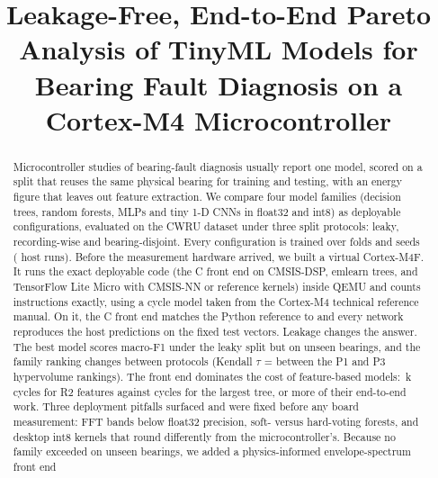 \documentclass[conference]{IEEEtran}
\begin{document}
\title{Leakage-Free, End-to-End Pareto Analysis of TinyML Models for Bearing Fault Diagnosis on a Cortex-M4 Microcontroller}

\author{
}

\maketitle

\begin{abstract}
Microcontroller studies of bearing-fault diagnosis usually report one model, scored on a split that reuses the same
physical bearing for training and testing, with an energy figure that leaves out feature extraction. We compare four
model families (decision trees, random forests, MLPs and tiny 1-D CNNs in float32 and int8) as \NumConfigs{}
deployable configurations, evaluated on the CWRU dataset under three split protocols: leaky, recording-wise and
bearing-disjoint. Every configuration is trained over \NumSplits{} folds and \NumSeedsMax{} seeds
(\NumRuns{} host runs). Before the measurement hardware arrived, we built a virtual Cortex-M4F. It runs the exact
deployable code (the C front end on CMSIS-DSP, emlearn trees, and TensorFlow Lite Micro with CMSIS-NN or reference
kernels) inside QEMU and counts instructions exactly, using a cycle model taken from the Cortex-M4 technical reference
manual. On it, the C front end matches the Python reference to \NumParityMax{} and every network reproduces the host
predictions on the \NumTV{} fixed test vectors. Leakage changes the answer. The best model scores
\NumPOneBest{} macro-F1 under the leaky split but \NumPThreeBest{} on unseen bearings, and the family ranking changes
between protocols (Kendall $\tau$ = \NumTauFamPOnePThree{} between the P1 and P3 hypervolume rankings). The front end
dominates the cost of feature-based models: \NumFeRTwoKcyc{}\,k cycles for R2 features against
\NumTreeInfMax{} cycles for the largest tree, \NumTreeFeShareMin{} or more of their end-to-end work. Three deployment
pitfalls surfaced and were fixed before any board measurement: FFT bands below float32 precision, soft- versus
hard-voting forests, and desktop int8 kernels that round differently from the microcontroller's. Because no
family exceeded \NumPThreeNoRFourBest{} on unseen bearings, we added a physics-informed envelope-spectrum front end

\end{abstract}
\end{document}
